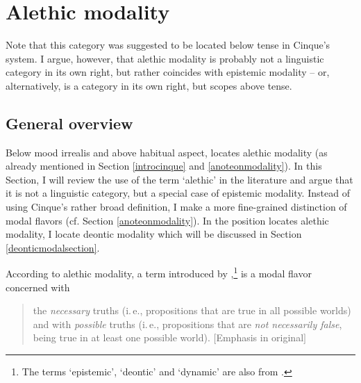
\section{Alethic modality}\label{alethicmodal}
Note that this category was suggested to be located below tense in Cinque's system. I argue, however, that alethic modality is probably not a linguistic category in its own right, but rather coincides with epistemic modality -- or, alternatively, is a category in its own right, but scopes above tense. 

\subsection{General overview}
Below mood irrealis and above habitual aspect, \citet{cinque1999adverbs} locates alethic modality (as already mentioned in Section \ref{introcinque} and \ref{anoteonmodality}). In this Section, I will review the use of the term `alethic' in the literature and argue that it is not a linguistic category, but a special case of epistemic modality. Instead of using Cinque's rather broad definition, I make a more fine-grained distinction of modal flavors (cf. Section \ref{anoteonmodality}). In the position \citet{cinque1999adverbs} locates alethic modality, I locate deontic modality which will be discussed in Section \ref{deonticmodalsection}.

According to \citet[78]{cinque1999adverbs} alethic modality, a term introduced by \citet{von1951essay},\footnote{ The terms `epistemic', `deontic' and `dynamic' are also from \citet{von1951essay}.} is a modal flavor concerned with

\begin{quote}
the \textit{necessary} truths (i.\,e., propositions that are true in all possible worlds) and with \textit{possible} truths (i.\,e., propositions that are \textit{not necessarily false}, being true in at least one possible world). $[$Emphasis in original$]$ %
\end{quote}

